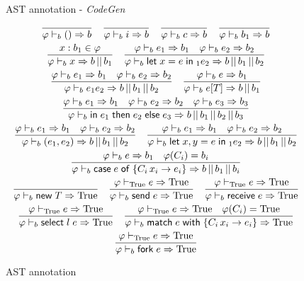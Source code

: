 \begin{figure}[t]
  AST annotation - \emph{CodeGen} \hfill{}
  \begin{gather*}
    \frac{}{\codeGen b {()} b} \quad
    \frac{}{\codeGen b {i} b} \quad
    \frac{}{\codeGen b {c} b} \quad
    \frac{}{\codeGen b {b_1} b}\\
    \frac{x : b_1 \in \varphi}
    {\codeGen b x {\orTwo b b_1}} \quad
    \frac{\codeGen{b}{e_1}{b_1} \quad \codeGen{b}{e_2}{b_2}}
    {\codeGen b {\unlete x e_1 e_2} {\orThree b {b_1}{b_2}}}\\
    \frac{\codeGen{b}{e_1}{b_1} \quad \codeGen{b}{e_2}{b_2}}
    {\codeGen b {e_1 e_2} {\orThree b {b_1}{b_2}}}\quad
    \frac{\codeGen{b}{e}{b_1}}
    {\codeGen b {\tappe e T} {\orTwo b b_1}}\\
    \frac{\codeGen{b}{e_1}{b_1} \quad \codeGen{b}{e_2}{b_2} \quad \codeGen{b}{e_3}{b_3}}
    {\codeGen b {\conde{e_1}{e_2}{e_3}} {\orFour b {b_1}{b_2}{b_3}}}\\
    \frac{\codeGen{b}{e_1}{b_1} \quad \codeGen{b}{e_2}{b_2}}
    {\codeGen b {\paire{e_1}{e_2}} {\orThree b {b_1}{b_2}}}\quad
    \frac{\codeGen{b}{e_1}{b_1} \quad \codeGen{b}{e_2}{b_2}}
    {\codeGen b {\binlete x y e_1 e_2} {\orThree b {b_1}{b_2}}}\\
    \frac{\codeGen{b}{e}{b_1} \quad \varphi(C_i) = b_i}
    {\codeGen b {\casee{e}{\{C_i\,x_i\rightarrow e_i\}}} {\orThree{b}{b_1}{b_i}}} \\
    \frac{}{\codeGen b {\newe T} {\True}} \quad
    \frac{\codeGen{\true}{e}{\True}} {\codeGen b {\sende e} {\True}} \quad
    \frac{\codeGen{\true}{e}{\True}} {\codeGen b {\recve e} {\True}}\\
    \frac{\codeGen{\true}{e}{\True}} {\codeGen b {\selecte l e} {\True}} \quad
    \frac{\codeGen{\true}{e}{\True} \quad \varphi(C_i) = \True}
    {\codeGen b {\matche{e}{\{C_i\,x_i\rightarrow e_i\}}} {\True}} \\
    \frac{\codeGen{\true}{e}{\True}}
    {\codeGen b {\forke e} {\True}}    
  \end{gather*}
  \caption{AST annotation}
  \label{fig:AST-annotation}
\end{figure}

